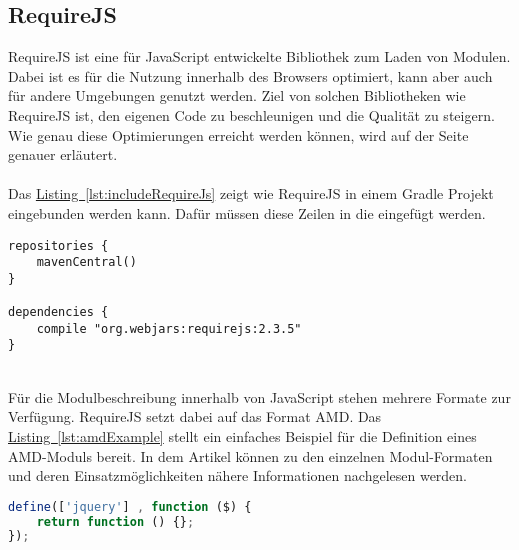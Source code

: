 \subsection{RequireJS}\label{sec:requireJs}
RequireJS \cite{requirejs} ist eine für JavaScript entwickelte Bibliothek zum Laden von Modulen. Dabei ist es für die Nutzung innerhalb des Browsers optimiert, kann aber auch für andere Umgebungen genutzt werden. Ziel von solchen Bibliotheken wie RequireJS ist, den eigenen Code zu beschleunigen und die Qualität zu steigern. Wie genau diese Optimierungen erreicht werden können, wird auf der Seite \cite{requireJsOptimizer} genauer erläutert.\\
\\
Das \hyperref[lst:includeRequireJs]{Listing~\ref{lst:includeRequireJs}} zeigt wie RequireJS in einem Gradle Projekt eingebunden werden kann. Dafür müssen diese Zeilen in die  eingefügt werden.\\
\begin{lstlisting}[style=lstStyleFramed, language=Gradle, caption={Einbindung der Bibliothek RequireJs mittels Gradle}, label=lst:includeRequireJs, float]
repositories {
	mavenCentral()
}

dependencies {
	compile "org.webjars:requirejs:2.3.5"
}
\end{lstlisting}
\\
Für die Modulbeschreibung innerhalb von JavaScript stehen mehrere Formate zur Verfügung. RequireJS setzt dabei auf das Format \gls{AMD}. Das \hyperref[lst:amdExample]{Listing~\ref{lst:amdExample}} stellt ein einfaches Beispiel für die Definition eines \gls{AMD}-Moduls bereit. In dem Artikel \cite{jsModuleDefinitions} können zu den einzelnen Modul-Formaten und deren Einsatzmöglichkeiten nähere Informationen nachgelesen werden.
\\
\begin{lstlisting}[style=lstStyleFramed, language=JavaScript, caption={Beispiel: Moduldefinition mittels AMD \cite{requirejsExample}}, label=lst:amdExample, float]
define(['jquery'] , function ($) {
	return function () {};
});
\end{lstlisting}

